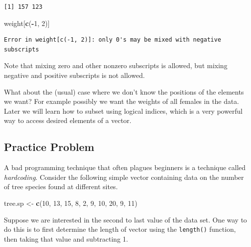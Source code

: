 \documentclass[
]{krantz}
\makeatletter
\newenvironment{Shaded}{\begin{snugshade}}{\end{snugshade}}
\newcommand{\DecValTok}[1]{\textcolor[rgb]{0.06,0.06,0.06}{#1}}
\newcommand{\KeywordTok}[1]{\textcolor[rgb]{0.27,0.27,0.27}{\textbf{#1}}}
\newcommand{\NormalTok}[1]{#1}
\newcommand{\OperatorTok}[1]{\textcolor[rgb]{0.43,0.43,0.43}{\textbf{#1}}}
\newcommand{\StringTok}[1]{\textcolor[rgb]{0.5,0.5,0.5}{#1}}
\newenvironment{kframe}{%
\medskip{}
\setlength{\fboxsep}{.8em}
 \def\at@end@of@kframe{}%
 \ifinner\ifhmode%
  \def\at@end@of@kframe{\end{minipage}}%
  \begin{minipage}{\columnwidth}%
 \fi\fi%
 \def\FrameCommand##1{\hskip\@totalleftmargin \hskip-\fboxsep
 \colorbox{shadecolor}{##1}\hskip-\fboxsep
     \hskip-\linewidth \hskip-\@totalleftmargin \hskip\columnwidth}%
 \MakeFramed {\advance\hsize-\width
   \@totalleftmargin\z@ \linewidth\hsize
   \@setminipage}}%
 {\par\unskip\endMakeFramed%
 \at@end@of@kframe}
\renewenvironment{Shaded}{\begin{kframe}}{\end{kframe}}
\makeatother
\begin{document}
\begin{verbatim}
[1] 157 123
\end{verbatim}

\begin{Shaded}
\begin{Highlighting}[]
\NormalTok{weight[}\KeywordTok{c}\NormalTok{(}\OperatorTok{{-}}\DecValTok{1}\NormalTok{, }\DecValTok{2}\NormalTok{)]}
\end{Highlighting}
\end{Shaded}

\begin{verbatim}
Error in weight[c(-1, 2)]: only 0's may be mixed with negative subscripts
\end{verbatim}

Note that mixing zero and other nonzero subscripts is allowed, but mixing negative and positive subscripts is not allowed.

What about the (usual) case where we don't know the positions of the elements we want? For example possibly we want the weights of all females in the data. Later we will learn how to subset using logical indices, which is a very powerful way to access desired elements of a vector.

\hypertarget{ch4PP1}{%
\subsection{Practice Problem}\label{ch4PP1}}

A bad programming technique that often plagues beginners is a technique called \emph{hardcoding}. Consider the following simple vector containing data on the number of tree species found at different sites.

\begin{Shaded}
\begin{Highlighting}[]
\NormalTok{tree.sp \textless{}{-}}\StringTok{ }\KeywordTok{c}\NormalTok{(}\DecValTok{10}\NormalTok{, }\DecValTok{13}\NormalTok{, }\DecValTok{15}\NormalTok{, }\DecValTok{8}\NormalTok{, }\DecValTok{2}\NormalTok{, }\DecValTok{9}\NormalTok{, }\DecValTok{10}\NormalTok{, }\DecValTok{20}\NormalTok{, }\DecValTok{9}\NormalTok{, }\DecValTok{11}\NormalTok{)}
\end{Highlighting}
\end{Shaded}

Suppose we are interested in the second to last value of the data set. One way to do this is to first determine the length of vector using the \texttt{length()} function, then taking that value and subtracting 1.
\end{document}
